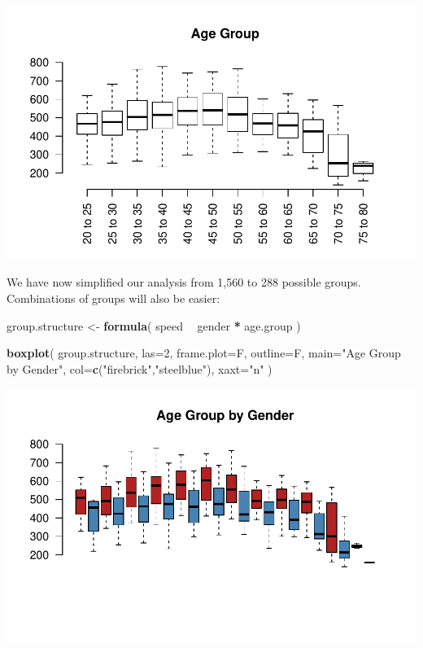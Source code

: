 \documentclass[]{book}
\newenvironment{Shaded}{\begin{snugshade}}{\end{snugshade}}
\newcommand{\DataTypeTok}[1]{\textcolor[rgb]{0.13,0.29,0.53}{#1}}
\newcommand{\DecValTok}[1]{\textcolor[rgb]{0.00,0.00,0.81}{#1}}
\newcommand{\KeywordTok}[1]{\textcolor[rgb]{0.13,0.29,0.53}{\textbf{#1}}}
\newcommand{\NormalTok}[1]{#1}
\newcommand{\OperatorTok}[1]{\textcolor[rgb]{0.81,0.36,0.00}{\textbf{#1}}}
\newcommand{\StringTok}[1]{\textcolor[rgb]{0.31,0.60,0.02}{#1}}
\theoremstyle{definition}
\theoremstyle{definition}
\theoremstyle{definition}
\theoremstyle{remark}
\begin{document}
\begin{center}\includegraphics[width=0.7\linewidth]{DS4PS-I_files/figure-latex/unnamed-chunk-166-1} \end{center}

We have now simplified our analysis from 1,560 to 288 possible groups.
Combinations of groups will also be easier:

\begin{Shaded}
\begin{Highlighting}[]

\NormalTok{group.structure <-}\StringTok{ }\KeywordTok{formula}\NormalTok{( speed }\OperatorTok{~}\StringTok{ }\NormalTok{gender }\OperatorTok{*}\StringTok{ }\NormalTok{age.group )}

\KeywordTok{boxplot}\NormalTok{( group.structure, }
         \DataTypeTok{las=}\DecValTok{2}\NormalTok{, }\DataTypeTok{frame.plot=}\NormalTok{F, }\DataTypeTok{outline=}\NormalTok{F, }\DataTypeTok{main=}\StringTok{"Age Group by Gender"}\NormalTok{,}
         \DataTypeTok{col=}\KeywordTok{c}\NormalTok{(}\StringTok{"firebrick"}\NormalTok{,}\StringTok{"steelblue"}\NormalTok{), }\DataTypeTok{xaxt=}\StringTok{"n"}\NormalTok{ )}
\end{Highlighting}
\end{Shaded}

\begin{center}\includegraphics[width=0.7\linewidth]{DS4PS-I_files/figure-latex/unnamed-chunk-167-1} \end{center}
\end{document}

